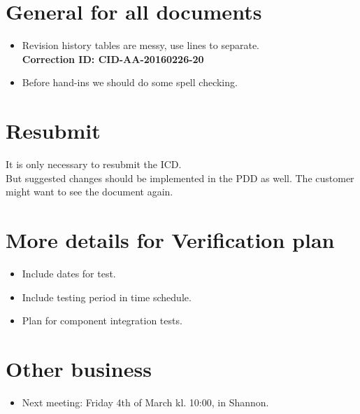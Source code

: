 \newpage
\section*{General for all documents}
\begin{itemize}
    \item Revision history tables are messy, use lines to separate.
    \\ \textbf{Correction ID: CID-AA-20160226-20}
    
    \item Before hand-ins we should do some spell checking.
\end{itemize}

\section*{Resubmit}
It is only necessary to resubmit the ICD.\\
But suggested changes should be implemented in the PDD as well. The customer might want to see the document again.

\section*{More details for Verification plan}
\begin{itemize}
    \item Include dates for test.
    \item Include testing period in time schedule.
    \item Plan for component integration tests.
\end{itemize}

\section*{Other business}
\begin{itemize}
    \item Next meeting: Friday 4th of March kl. 10:00, in Shannon.
\end{itemize}


